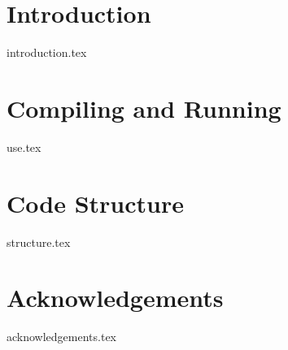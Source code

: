 \documentclass[letterpaper, 12pt]{article}
\begin{document}
\heading

\newpage

\tableofcontents

\newpage

\section{Introduction}
    {introduction.tex}
    
\section{Compiling and Running}
	{use.tex}

\section{Code Structure}
	{structure.tex}

\section*{Acknowledgements}
	{acknowledgements.tex}
    
\newpage
    
\clearpage
{}


\end{document}
